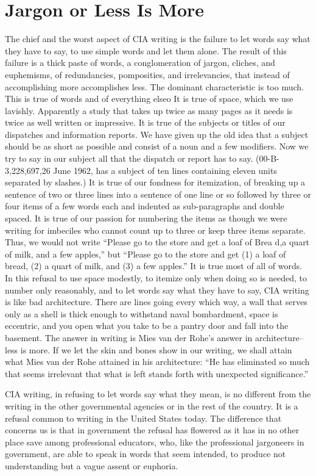 \documentclass[
    oneside,
    11pt,
    draft
]{memoir}
\begin{document}
\chapter{Jargon or Less Is More}
The chief and the worst aspect of CIA writing is the failure to let words say what they have to say, to use simple words and let them alone. The result of this failure is a thick paste of words, a conglomeration of jargon, cliches, and euphemisms, of redundancies, pomposities, and irrelevancies, that instead of accomplishing more accomplishes less. The dominant characteristic is too much. This is true of words and of everything elseo It is true of space, which we use lavishly. Apparently a study that takes up twice as many pages as it needs is twice as well written or impressive. It is true of the subjects or titles of our dispatches and information reports. We have given up the old idea that a subject should be as short as possible and consist of a noun and a few modifiers. Now we try to say in our subject all that the dispatch or report has to say. (00-B-3,228,697,26 June 1962, has a subject of ten lines containing eleven units separated by slashes.) It is true of our fondness for itemization, of breaking up a sentence of two or three lines into a sentence of one line or so followed by three or four items of a few words each and indented as sub-paragraphs and double spaced. It is true of our passion for numbering the items as though we were writing for imbeciles who cannot count up to three or keep three items separate. Thus, we would not write \enquote{Please go to the store and get a loaf of Brea d,a quart of milk, and a few apples,} but \enquote{Please go to the store and get (1) a loaf of bread, (2) a quart of milk, and (3) a few apples.} It is true most of all of words. In this refusal to use space modestly, to itemize only when doing so is needed, to number only reasonably, and to let words say what they have to say, CIA writing is like bad architecture. There are lines going every which way, a wall that serves only as a shell is thick enough to withstand naval bombardment, space is eccentric, and you open what you take to be a pantry door and fall into the basement. The answer in writing is Mies van der Rohe's answer in architecture--less is more. If we let the skin and bones show in our writing, we shall attain what Mies van der Rohe attained in his architecture: \enquote{He has eliminated so much that seems irrelevant that what is left stands forth with unexpected significance.}

CIA writing, in refusing to let words say what they mean, is no different from the writing in the other governmental agencies or in the rest of the country. It is a refusal common to writing in the United States today. The difference that concerns us is that in government the refusal has flowered as it has in no other place save among professional educators, who, like the professional jargoneers in government, are able to speak in words that seem intended, to produce not understanding but a vague assent or euphoria. 
\end{document}
